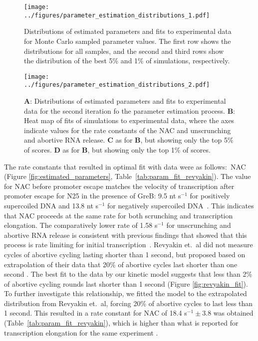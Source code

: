 
\begin{figure}
	\begin{center}
      \texttt{[image: ../figures/parameter\_estimation\_distributions\_1.pdf]}
	\end{center}
    \caption{Distributions of estimated parameters and fits to experimental
      data for Monte Carlo sampled parameter values.  The first row shows the
      distributions for all samples, and the second and third rows show the
      distribution of the best 5\% and 1\% of simulations, respectively.}
      \label{fig:parameter_estimation_1}
\end{figure}

\begin{figure}
	\begin{center}
      \texttt{[image: ../figures/parameter\_estimation\_distributions\_2.pdf]}
	\end{center}
    \caption{
      \textbf{A}: Distributions of estimated parameters and fits to
      experimental data for the second iteration fo the parameter
      estimation process. \textbf{B}: Heat map of fits of simulations to experimental
      data, where the axes indicate values for the rate constants of the NAC
      and unscrunching and abortive RNA release. \textbf{C} as for \textbf{B},
      but showing only the top 5\% of scores. \textbf{D} as for \textbf{B},
      but showing only the top 1\% of scores.}
      \label{fig:parameter_estimation_2}
\end{figure}

The rate constants that resulted in optimal fit with data were as follows:~NAC
(Figure \ref{fig:estimated_parameters},
Table~\ref{tab:param_fit_revyakin}). The value for NAC before promoter escape
matches the velocity of transcription after promoter escape for N25 in the
presence of GreB: 9.5 nt s$^{-1}$ for positively supercoiled DNA and 13.8 nt
s$^{-1}$ for negatively supercoiled DNA~\cite{revyakin_abortive_2006}. This
indicates that NAC proceeds at the same rate for both scrunching and
transcription elongation. The comparatively lower rate of 1.58 s$^{-1}$ for
unscrunching and abortive RNA release is consistent with previous findings
that showed that this process is rate limiting for initial
transcription~\cite{margeat_direct_2006, revyakin_abortive_2006}. Revyakin
et.\ al did not measure cycles of abortive cycling lasting shorter than 1
second, but proposed based on extrapolation of their data that 20\% of
abortive cycles last shorter than one second \cite{revyakin_abortive_2006}.
The best fit to the data by our kinetic model suggests that less than 2\% of
abortive cycling rounds last shorter than 1 second (Figure
\ref{fig:revyakin_fit}). To further investigate this relationship, we fitted
the model to the extrapolated distribution from Revyakin et.\ al, forcing 20\%
of abortive cycles to last less than 1 second.  This resulted in a rate
constant for NAC of 18.4 s$^{-1} \pm 3.8$ was obtained
(Table~\ref{tab:param_fit_revyakin}), which is higher than what is reported
for transcription elongation for the same experiment
\cite{revyakin_abortive_2006}.

